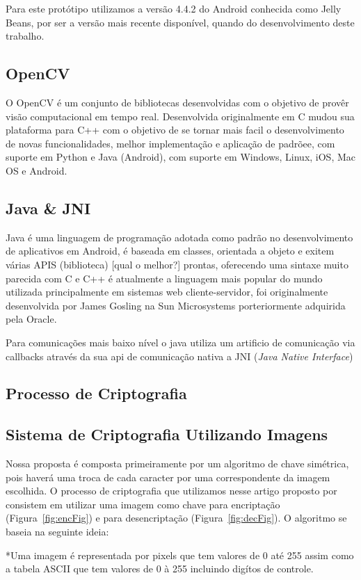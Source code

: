 \documentclass[12pt]{article}
\begin{document}
Para este protótipo utilizamos a versão 4.4.2 do Android conhecida como Jelly Beans, por ser a versão mais recente disponível, quando do desenvolvimento deste trabalho. 
\subsection{OpenCV}
O OpenCV é um conjunto de bibliotecas desenvolvidas com o objetivo de provêr visão computacional em tempo real. Desenvolvida originalmente em C mudou sua plataforma para C++ com o objetivo de se tornar mais facil o desenvolvimento de novas funcionalidades, melhor implementação e aplicação de padrõee, com suporte em Python e Java (Android), com suporte em Windows, Linux, iOS, Mac OS e Android.
\subsection{Java \& JNI}
Java é uma linguagem de programação adotada como padrão no desenvolvimento de aplicativos em Android, é baseada em classes, orientada a objeto e exitem várias APIS (biblioteca) [qual o melhor?] prontas, oferecendo uma sintaxe muito parecida com C e C++ é atualmente a linguagem mais popular do mundo utilizada principalmente em sistemas web cliente-servidor, foi originalmente desenvolvida por James Gosling na Sun Microsystems porteriormente adquirida pela Oracle.

Para comunicações mais baixo nível o java utiliza um artificio de comunicação via callbacks através da sua api de comunicação nativa a JNI (\textit{Java Native Interface})
\subsection{Processo de Criptografia}
\subsection{Sistema de Criptografia Utilizando Imagens}
Nossa proposta é composta primeiramente por um algoritmo de chave simétrica, pois haverá uma troca de cada caracter por uma correspondente da imagem escolhida. O processo de criptografia que utilizamos nesse artigo proposto por \cite{mikhail:2010} consistem em utilizar uma imagem como chave para encriptação (Figura~\ref{fig:encFig}) e para desencriptação (Figura~\ref{fig:decFig}). O algoritmo se baseia na seguinte ideia:

*Uma imagem é representada por pixels que tem valores de 0 até 255 assim como a tabela ASCII que tem valores de 0 à 255 incluindo digítos de controle.
\end{document}
